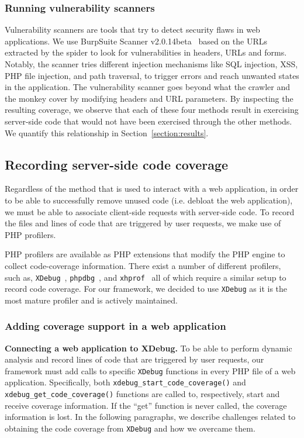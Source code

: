\subsubsection{Running vulnerability scanners}
Vulnerability scanners are tools that try to detect security flaws in web applications.
We use BurpSuite Scanner v2.0.14beta~\cite{burpsuite} based on the URLs extracted by the spider to look for vulnerabilities in headers, URLs and forms.
Notably, the scanner tries different injection mechanisms like SQL injection, XSS, PHP file injection, and path traversal, to trigger errors and reach unwanted states in the application.
The vulnerability scanner goes beyond what the crawler and the monkey cover by modifying headers and URL parameters.
By inspecting the resulting coverage, we observe that each of these four methods result in exercising server-side code that would not have been exercised through the other methods. We quantify this relationship in Section~\ref{section:results}.


\subsection{Recording server-side code coverage}
\label{subsec:coverage}

Regardless of the method that is used to interact with a web application,
in order to be able to successfully remove unused code (i.e. debloat the web
application), we must be able to
associate client-side requests with server-side code. To record the files
and lines of code that are triggered by user requests, we make use of PHP
profilers.

PHP profilers are available as PHP extensions that modify the PHP engine to
collect code-coverage information. There exist a number of different profilers,
such as, \texttt{XDebug}~\cite{XDebug}, \texttt{phpdbg}~\cite{phpdbg}, and
\texttt{xhprof}~\cite{xhprof} all of which require a similar setup to record
code coverage. For our framework, we decided to use \texttt{XDebug} as it
is the most mature profiler and is actively maintained.

\subsubsection{Adding coverage support in a web application}

\vspace{1ex}
\noindent\textbf{Connecting a web application to XDebug.}
To be able to perform dynamic analysis and record lines of code
that are triggered by user requests, our framework must add calls
to specific \texttt{XDebug} functions in every PHP file of a web
application. Specifically, both \texttt{xdebug\_start\_code\_coverage()} and
\texttt{xdebug\_get\_code\_coverage()} functions are called to, respectively,
start and receive coverage information. If the ``get'' function is never
called, the coverage information is lost. In the following paragraphs, we
describe challenges related to obtaining the code coverage from \texttt{XDebug}
and how we overcame them.

